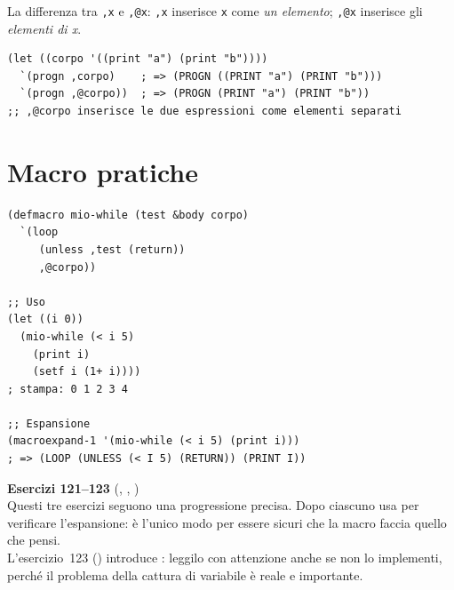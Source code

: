 \begin{tcolorbox}[
  enhanced,
  colback=black!2, colframe=black!20,
  arc=3pt, boxrule=0.4pt,
  left=12pt, right=12pt, top=9pt, bottom=9pt,
  before skip=8pt, after skip=10pt
]
\medskip
La differenza tra \texttt{,x} e \texttt{,@x}:
\texttt{,x} inserisce \texttt{x} come \emph{un elemento};
\texttt{,@x} inserisce gli \emph{elementi di x}.

\begin{tcolorbox}[enhanced, colback=clBg, colframe=gray!40,
  arc=2pt, boxrule=0.4pt, left=8pt, right=6pt, top=4pt, bottom=4pt,
  before skip=4pt, after skip=4pt]
\begin{lstlisting}
(let ((corpo '((print "a") (print "b"))))
  `(progn ,corpo)    ; => (PROGN ((PRINT "a") (PRINT "b")))
  `(progn ,@corpo))  ; => (PROGN (PRINT "a") (PRINT "b"))
;; ,@corpo inserisce le due espressioni come elementi separati
\end{lstlisting}
\end{tcolorbox}
\end{tcolorbox}

\section{Macro pratiche}


\begin{concetto}{}
\end{concetto}

\begin{esempio}
\begin{lstlisting}
(defmacro mio-while (test &body corpo)
  `(loop
     (unless ,test (return))
     ,@corpo))

;; Uso
(let ((i 0))
  (mio-while (< i 5)
    (print i)
    (setf i (1+ i))))
; stampa: 0 1 2 3 4

;; Espansione
(macroexpand-1 '(mio-while (< i 5) (print i)))
; => (LOOP (UNLESS (< I 5) (RETURN)) (PRINT I))
\end{lstlisting}
\end{esempio}

\begin{workbook}
\textbf{Esercizi 121--123}
(, , )\\[4pt]
Questi tre esercizi seguono una progressione precisa.
Dopo ciascuno usa  per verificare l'espansione:
è l'unico modo per essere sicuri che la macro faccia quello che pensi.\\[4pt]
L'esercizio~123 () introduce : leggilo con
attenzione anche se non lo implementi, perché il problema della
cattura di variabile è reale e importante.
\end{workbook}

